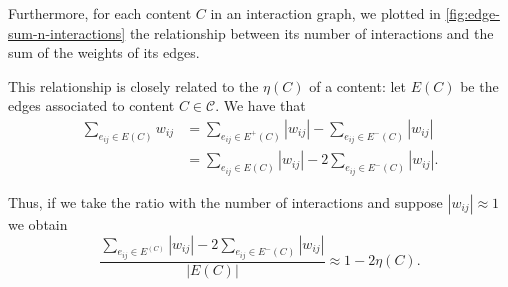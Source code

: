 \bigskip
Furthermore, for each content $C$ in an interaction graph, we plotted in
\autoref{fig:edge-sum-n-interactions} the relationship between its number of
interactions and the sum of the weights of its edges.

This relationship is closely related to the $\eta(C)$ of a content: let $E(C)$
be the edges associated to content $C \in \mathcal{C} $. We have that
\begin{align*}
	\sum^{}_{e_{ij} \in E(C)} w_{ij} & = \sum^{}_{e_{ij} \in E^+(C)} |w_{ij}|
	- \sum^{}_{e_{ij} \in E^-(C)} |w_{ij}|                                      \\
	                                 & = \sum^{}_{e_{ij} \in E(C)} |w_{ij}| - 2
	\sum^{}_{e_{ij} \in E^-(C)} |w_{ij}|.
\end{align*}

Thus, if we take the ratio with the number of interactions  and suppose
$|w_{ij}| \approx 1$ we obtain
\begin{equation}
	\label{eq:angular-coeff-eta}
	\frac{\sum^{}_{e_{ij} \in E^(C)} |w_{ij}| - 2 \sum^{}_{e_{ij} \in E^-(C)}
	|w_{ij}|}{|E(C)|} \approx 1 - 2 \eta(C).
\end{equation}

